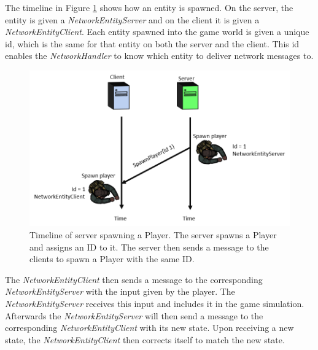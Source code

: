 The timeline in Figure \ref{fig:clientServerEntities} shows how an entity is spawned.
On the server, the entity is given a \emph{NetworkEntityServer} and on the client it is given a \emph{NetworkEntityClient}.
Each entity spawned into the game world is given a unique id, which is the same for that entity on both the server and the client.
This id enables the \emph{NetworkHandler} to know which entity to deliver network messages to.

\begin{figure}[H]
\centering
\includegraphics[scale=1]{figures/network/clientServerEntities}
\caption{Timeline of server spawning a Player. The server spawns a Player and assigns an ID to it. The server then sends a message to the clients to spawn a Player with the same ID.}
\label{fig:clientServerEntities}
\end{figure}

The \emph{NetworkEntityClient} then sends a message to the corresponding \emph{NetworkEntityServer} with the input given by the player.
The \emph{NetworkEntityServer} receives this input and includes it in the game simulation.
Afterwards the \emph{NetworkEntityServer} will then send a message to the corresponding \emph{NetworkEntityClient} with its new state.
Upon receiving a new state, the \emph{NetworkEntityClient} then corrects itself to match the new state.